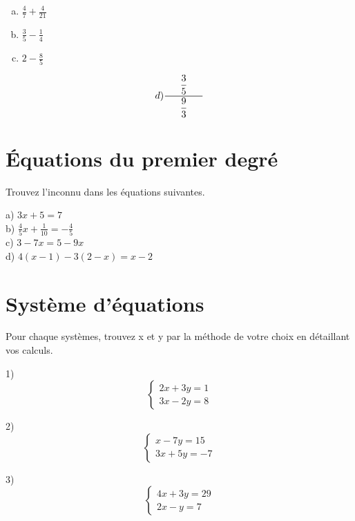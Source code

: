 \documentclass[12pt,a4paper]{article} %
\begin{document}
\Large{
\begin{enumerate}[a)]
    \item \settowidth{\mt}{$123ABC$}
$\frac{4}{7}+\frac{4}{21}$
    \item $\frac{3}{5}-\frac{1}{4}$
    \item $2 - \frac{8}{5}$
\end{enumerate} }
\[d)\genfrac{}{}{0.5pt}{0}{\mbox{\phantom{xxx}}\dfrac{3}{5} \mbox{\phantom{xxx}}}{\dfrac{9}{3}}\]

\section{Équations du premier degré}

\begin{exo} Trouvez l'inconnu dans les équations suivantes.\end{exo}  

a) $3x+5=7$ \\


b) $\frac{4}{5}x+\frac{1}{10}=-\frac{4}{5}$ \\


c) $3-7x=5-9x$ \\


d) $4(x-1)-3(2-x)=x-2$

\section{Système d'équations}
\begin{exo} Pour chaque systèmes, trouvez x et y par la méthode de votre choix en détaillant vos calculs.\end{exo} 
1)
$$
\left\{
    \begin{array}{ll}
        2x + 3y = 1 \\
        3x - 2y = 8
    \end{array}
\right.
$$

2)
$$
\left\{
    \begin{array}{ll}
        x - 7y = 15 \\
        3x + 5y = -7
    \end{array}
\right.
$$

3)
$$
\left\{
    \begin{array}{ll}
        4x + 3y = 29 \\
        2x - y = 7
    \end{array}
\right.
$$
\end{document}
